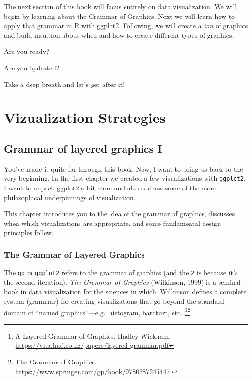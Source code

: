 \documentclass[
]{book}
\begin{document}
The next section of this book will focus entirely on data visualization. We will begin by learning about the Grammar of Graphics. Next we will learn how to apply that grammar in R with ggplot2. Following, we will create a \emph{ton} of graphics and build intuition about when and how to create different types of graphics.

Are you ready?

Are you hydrated?

Take a deep breath and let's get after it!

\hypertarget{part-vizualization-strategies}{%
\part{Vizualization Strategies}\label{part-vizualization-strategies}}

\hypertarget{layered-i}{%
\chapter{Grammar of layered graphics I}\label{layered-i}}

You've made it quite far through this book. Now, I want to bring us back to the very beginning. In the first chapter we created a few visualizations with \texttt{ggplot2}. I want to unpack ggplot2 a bit more and also address some of the more philosophical underpinnings of visualization.

This chapter introduces you to the idea of the grammar of graphics, discusses when which visualizations are appropriate, and some fundamental design principles follow.

\hypertarget{the-grammar-of-layered-graphics}{%
\section{The Grammar of Layered Graphics}\label{the-grammar-of-layered-graphics}}

The \texttt{gg} in \texttt{ggplot2} refers to the grammar of graphics (and the \texttt{2} is because it's the second iteration). \emph{The Grammar of Graphics} (Wilkinson, 1999) is a seminal book in data visualization for the sciences in which, Wilkinson defines a complete system (grammar) for creating visualizations that go beyond the standard domain of ``named graphics''---e.g.~histogram, barchart, etc. \footnote{A Layered Grammar of Graphics. Hadley Wickham. \url{https://vita.had.co.nz/papers/layered-grammar.pdf}}\footnote{The Grammar of Graphics. \url{https://www.springer.com/gp/book/9780387245447}.}
\end{document}
